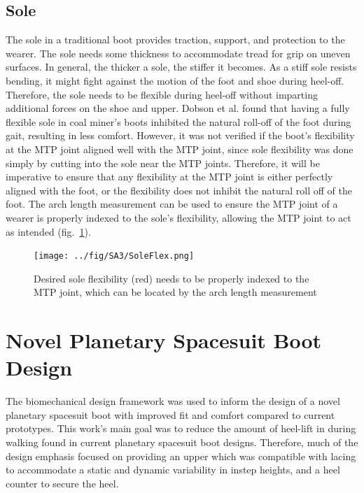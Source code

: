 \documentclass[defaultstyle,11pt]{thesis}
\begin{document}
\hypertarget{sole}{%
\subsection{Sole}\label{sole}}

The sole in a traditional boot provides traction, support, and protection to the wearer.
The sole needs some thickness to accommodate tread for grip on uneven surfaces.
In general, the thicker a sole, the stiffer it becomes.
As a stiff sole resists bending, it might fight against the motion of the foot and shoe during heel-off.
Therefore, the sole needs to be flexible during heel-off without imparting additional forces on the shoe and upper.
Dobson et al. \citep{Dobson2020} found that having a fully flexible sole in coal miner's boots inhibited the natural roll-off of the foot during gait, resulting in less comfort.
However, it was not verified if the boot's flexibility at the MTP joint aligned well with the MTP joint, since sole flexibility was done simply by cutting into the sole near the MTP joints.
Therefore, it will be imperative to ensure that any flexibility at the MTP joint is either perfectly aligned with the foot, or the flexibility does not inhibit the natural roll off of the foot.
The arch length measurement can be used to ensure the MTP joint of a wearer is properly indexed to the sole's flexibility, allowing the MTP joint to act as intended (fig.~\ref{fig:SA3-SoleFlex}).

\begin{figure}
\hypertarget{fig:SA3-SoleFlex}{%
\centering
\texttt{[image: ../fig/SA3/SoleFlex.png]}
\caption{Desired sole flexibility (red) needs to be properly indexed to the MTP joint, which can be located by the arch length measurement}\label{fig:SA3-SoleFlex}
}
\end{figure}

\hypertarget{novel-planetary-spacesuit-boot-design}{%
\section{Novel Planetary Spacesuit Boot Design}\label{novel-planetary-spacesuit-boot-design}}

The biomechanical design framework was used to inform the design of a novel planetary spacesuit boot with improved fit and comfort compared to current prototypes.
This work's main goal was to reduce the amount of heel-lift in during walking found in current planetary spacesuit boot designs.
Therefore, much of the design emphasis focused on providing an upper which was compatible with lacing to accommodate a static and dynamic variability in instep heights, and a heel counter to secure the heel.
\end{document}
